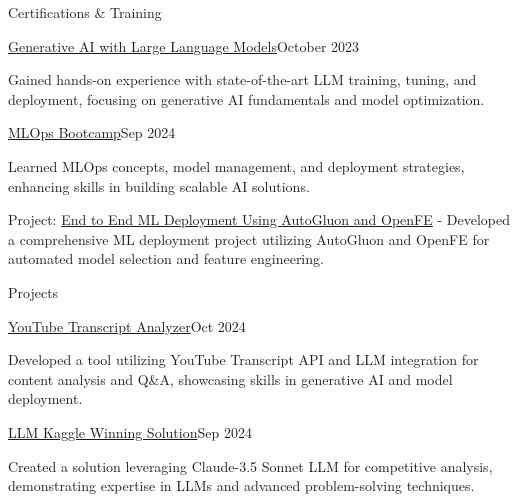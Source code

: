 \documentclass{resume} %
\begin{document}
\begin{rSection}{Certifications \& Training}
            \begin{rSubsection}
            {\href{https://coursera.org/share/9459a80d6710c6beebe8355a73b52368}{Generative AI with Large Language Models}}{October 2023}
            {}{}
                            \item Gained hands-on experience with state-of-the-art LLM training, tuning, and deployment, focusing on generative AI fundamentals and model optimization.
                                    \end{rSubsection}
            \begin{rSubsection}
            {\href{https://certificate.datatalks.club/mlops-zoomcamp/2024/55db812d19a5b355790d127cb88ca72afdc49df5.pdf}{MLOps Bootcamp}}{Sep 2024}
            {}{}
                            \item Learned MLOps concepts, model management, and deployment strategies, enhancing skills in building scalable AI solutions.
                                    \item Project: \href{https://github.com/ArturGR3/MLOps-project}{End to End ML Deployment Using AutoGluon and OpenFE} - Developed a comprehensive ML deployment project utilizing AutoGluon and OpenFE for automated model selection and feature engineering.
                                    \end{rSubsection}
    \end{rSection}

\begin{rSection}{Projects}
            \begin{rSubsection}
            {\href{https://github.com/ArturGR3/Youtube-transcript-Q-A}{YouTube Transcript Analyzer}}{Oct 2024}{}{}
                            \item Developed a tool utilizing YouTube Transcript API and LLM integration for content analysis and Q\&A, showcasing skills in generative AI and model deployment.
                    \end{rSubsection}
            \begin{rSubsection}
            {\href{https://github.com/ArturGR3/LLM-kaggle-competition}{LLM Kaggle Winning Solution}}{Sep 2024}{}{}
                            \item Created a solution leveraging Claude-3.5 Sonnet LLM for competitive analysis, demonstrating expertise in LLMs and advanced problem-solving techniques.
                    \end{rSubsection}
    \end{rSection}
\end{document}
